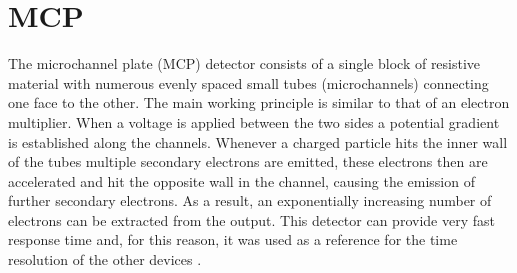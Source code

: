 \section{MCP}\label{sec:MCP_description}
The microchannel plate (MCP) detector consists of a single block of resistive material with numerous evenly spaced small tubes (microchannels) connecting one face to the other. The main working principle is similar to that of an electron multiplier. When a voltage is applied between the two sides a potential gradient is established along the channels. Whenever a charged particle hits the inner wall of the tubes multiple secondary electrons are emitted, these electrons then are accelerated and hit the opposite wall in the channel, causing the emission of further secondary electrons. As a result, an exponentially increasing number of electrons can be extracted from the output. This detector can provide very fast response time and, for this reason, it was used as a reference for the time resolution of the other devices \cite{LADISLASWIZA1979587}.


